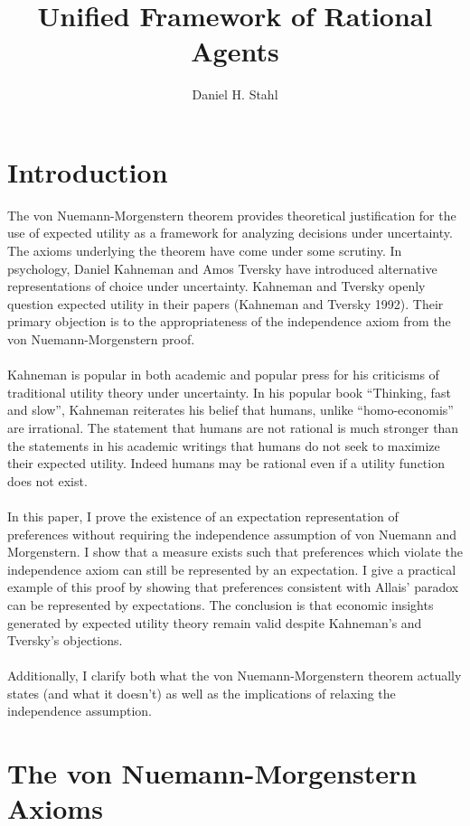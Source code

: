 \documentclass{article}
\begin{document}
	
	
\title{Unified Framework of Rational Agents}
\date{}
\author{Daniel H. Stahl}

\section{Introduction}

The von Nuemann-Morgenstern theorem provides theoretical justification for the use of expected utility as a framework for analyzing decisions under uncertainty.  The axioms underlying the theorem have come under some scrutiny.  In psychology, Daniel Kahneman and Amos Tversky have introduced alternative representations of choice under uncertainty.  Kahneman and Tversky openly question expected utility in their papers (Kahneman and Tversky 1992).  Their primary objection is to the appropriateness of the independence axiom from the von Nuemann-Morgenstern proof.    
\\
\\
Kahneman is popular in both academic and popular press for his criticisms of traditional utility theory under uncertainty.  In his popular book ``Thinking, fast and slow'', Kahneman reiterates his belief that humans, unlike ``homo-economis'' are irrational.  The statement that humans are not rational is much stronger than the statements in his academic writings that humans do not seek to maximize their expected utility.  Indeed humans may be rational even if a utility function does not exist.  
\\
\\
In this paper, I prove the existence of an expectation representation of preferences without requiring the independence assumption of von Nuemann and Morgenstern.  I show that a measure exists such that preferences which violate the independence axiom can still be represented by an expectation.  I give a practical example of this proof by showing that preferences consistent with Allais' paradox can be represented by expectations.  The conclusion is that economic insights generated by expected utility theory remain valid despite Kahneman's and Tversky's objections.   
\\
\\
Additionally, I clarify both what the von Nuemann-Morgenstern theorem actually states (and what it doesn't) as well as the implications of relaxing the independence assumption.


\section{The von Nuemann-Morgenstern Axioms}
\end{document}
